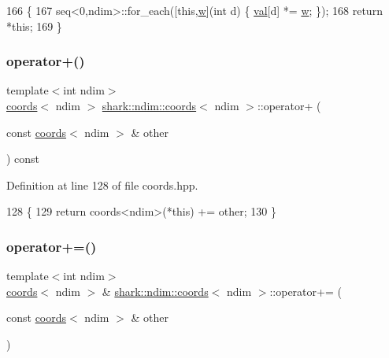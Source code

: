 \begin{DoxyCode}
166                                                            \{
167             seq<0,ndim>::for\_each([\textcolor{keyword}{this},\hyperlink{classshark_1_1_group_af542c8e71a81c12d6a73203ef9152d1f}{w}](\textcolor{keywordtype}{int} d) \{ \hyperlink{structshark_1_1ndim_1_1coords_a425262af388367b0f0079218e038aef5}{val}[d] *= \hyperlink{classshark_1_1_group_af542c8e71a81c12d6a73203ef9152d1f}{w}; \});
168             \textcolor{keywordflow}{return} *\textcolor{keyword}{this};
169         \}
\end{DoxyCode}
\hypertarget{structshark_1_1ndim_1_1coords_a0ce449dfa3670895f990acdee7ed50e8}{}\label{structshark_1_1ndim_1_1coords_a0ce449dfa3670895f990acdee7ed50e8} 
\subsubsection{\texorpdfstring{operator+()}{operator+()}}
{\footnotesize\ttfamily template$<$int ndim$>$ \\
\hyperlink{structshark_1_1ndim_1_1coords}{coords}$<$ ndim $>$ \hyperlink{structshark_1_1ndim_1_1coords}{shark\+::ndim\+::coords}$<$ ndim $>$\+::operator+ (\begin{DoxyParamCaption}\item[{const \hyperlink{structshark_1_1ndim_1_1coords}{coords}$<$ ndim $>$ \&}]{other }\end{DoxyParamCaption}) const\hspace{0.3cm}{\ttfamily [inline]}}



Definition at line 128 of file coords.\+hpp.


\begin{DoxyCode}
128                                                                                    \{
129             \textcolor{keywordflow}{return} coords<ndim>(*this) += other;
130         \}
\end{DoxyCode}
\hypertarget{structshark_1_1ndim_1_1coords_a116697a6b24f4b700b920d8af4b4f17d}{}\label{structshark_1_1ndim_1_1coords_a116697a6b24f4b700b920d8af4b4f17d} 
\subsubsection{\texorpdfstring{operator+=()}{operator+=()}}
{\footnotesize\ttfamily template$<$int ndim$>$ \\
\hyperlink{structshark_1_1ndim_1_1coords}{coords}$<$ ndim $>$ \& \hyperlink{structshark_1_1ndim_1_1coords}{shark\+::ndim\+::coords}$<$ ndim $>$\+::operator+= (\begin{DoxyParamCaption}\item[{const \hyperlink{structshark_1_1ndim_1_1coords}{coords}$<$ ndim $>$ \&}]{other }\end{DoxyParamCaption})\hspace{0.3cm}{\ttfamily [inline]}}



